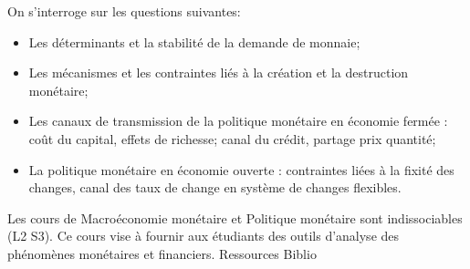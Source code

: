 \documentclass[10pt, a5paper]{report}
\begin{document}
{
On s'interroge sur les questions suivantes:
\begin{itemize}
\item Les déterminants et la stabilité de la demande de monnaie;
\item Les mécanismes et les contraintes liés à la création et la destruction monétaire;
\item Les canaux de transmission de la politique monétaire en économie fermée : coût du capital, effets de richesse; canal du crédit, partage prix quantité;
\item La politique monétaire en économie ouverte : contraintes liées à la fixité des changes, canal des taux de change en système de changes flexibles.
\end{itemize}
}
{Les cours de Macroéconomie monétaire et Politique monétaire sont indissociables (L2 S3).}
{Ce cours vise à fournir aux étudiants des outils d'analyse des phénomènes monétaires et financiers.}
{Ressources} 
{Biblio} 

\vfill

\end{document}
